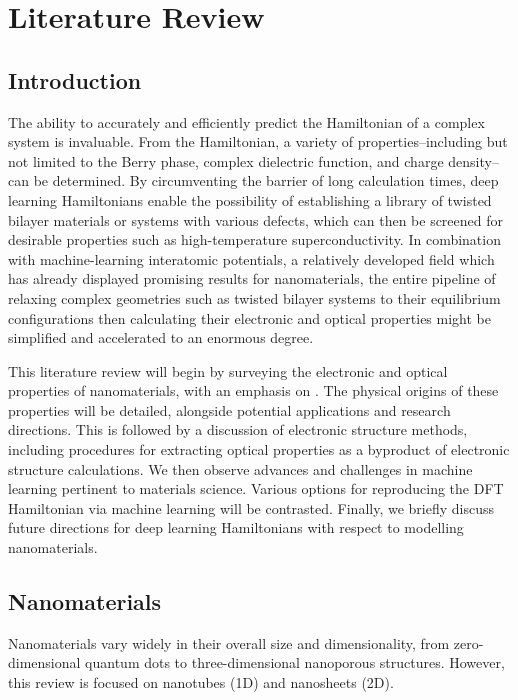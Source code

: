 \documentclass[11pt,a4paper,twoside]{report}  %
\numberwithin{equation}{section}					%
\numberwithin{figure}{section}						%
\begin{document}
\chapter{Literature Review}

\section{Introduction}

The ability to accurately and efficiently predict the Hamiltonian of a complex system is invaluable. From the Hamiltonian, a variety of properties--including but not limited to the Berry phase, complex dielectric function, and charge density--can be determined\autocite{liDeeplearningDensityFunctional2022}. By circumventing the barrier of long calculation times, deep learning Hamiltonians enable the possibility of establishing a library of twisted bilayer materials or systems with various defects, which can then be screened for desirable properties such as high-temperature superconductivity. In combination with machine-learning interatomic potentials, a relatively developed field which has already displayed promising results for nanomaterials, the entire pipeline of relaxing complex geometries such as twisted bilayer systems to their equilibrium configurations then calculating their electronic and optical properties might be simplified and accelerated to an enormous degree\autocite{liCriticalReviewMachine2025}. 

This literature review will begin by surveying the electronic and optical properties of nanomaterials, with an emphasis on .  The physical origins of these properties will be detailed, alongside potential applications and research directions. This is followed by a discussion of electronic structure methods, including procedures for extracting optical properties as a byproduct of electronic structure calculations. We then observe advances and challenges in machine learning pertinent to materials science. Various options for reproducing the DFT Hamiltonian via machine learning will be contrasted. Finally, we briefly discuss future directions for deep learning Hamiltonians with respect to modelling nanomaterials. 

\section{Nanomaterials}

Nanomaterials vary widely in their overall size and dimensionality, from zero-dimensional quantum dots to three-dimensional nanoporous structures. However, this review is focused on nanotubes (1D) and nanosheets (2D).
\end{document}
